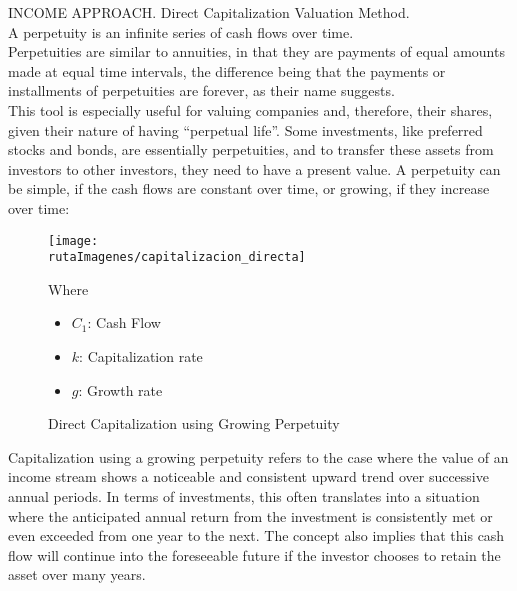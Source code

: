 \textcolor{secundario}{INCOME APPROACH. Direct Capitalization Valuation Method. }\\


A \textcolor{principal}{perpetuity} is an infinite series of cash flows over time.\\

\textcolor{principal}{Perpetuities} are similar to annuities, in that they are payments of equal amounts made at equal time intervals, the difference being that the payments or installments of perpetuities are forever, as their name suggests.\\

This tool is especially useful for valuing companies and, therefore, their shares, given their nature of having ``perpetual life''. Some investments, like preferred stocks and bonds, are essentially perpetuities, and to transfer these assets from investors to other investors, they need to have a present value.
A perpetuity can be simple, if the cash flows are constant over time, or growing, if they increase over time:\\


\begin{center}
\begin{figure}[H]
\centering
	\caption{Direct Capitalization using Growing Perpetuity \label{fig:cap_dir}}\vspace{10pt}
	\texttt{[image: \\rutaImagenes/capitalizacion\_directa]}\\
	
	\begin{minipage}{5cm}
	Where
	\begin{itemize}
	

	
		\item $C_1$: Cash Flow
		\item $k$: Capitalization rate
		\item $g$: Growth rate
	\end{itemize}
	\end{minipage}
\end{figure}
\end{center}



\textcolor{principal}{Capitalization using a growing perpetuity} refers to the case where the value of an income stream shows a noticeable and consistent upward trend over successive annual periods. In terms of investments, this often translates into a situation where the anticipated annual return from the investment is consistently met or even exceeded from one year to the next. The concept also implies that this cash flow will continue into the foreseeable future if the investor chooses to retain the asset over many years.\\

